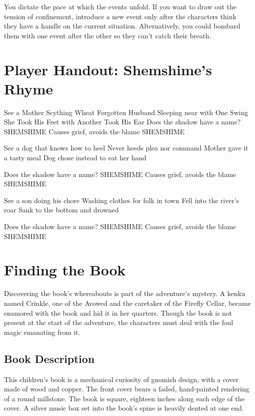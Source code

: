 \documentclass[10pt,a4paper,twoside,bg=print,twocolumn,openany,nodeprecatedcode]{dndbook}
\begin{document}
You dictate the pace at which the events unfold. If you want to draw out the tension of confinement, introduce a new event only after the characters think they have a handle on the current situation. Alternatively, you could bombard them with one event after the other so they can't catch their breath.

\section{Player Handout: Shemshime's Rhyme}
\begin{DndSidebar}[float=!b]{See a Mother Scything Wheat Forgotten Husband Sleeping near with One Swing She Took His Feet with Another Took His Ear}
Does the shadow have a name? SHEMSHIME Causes grief, avoids the blame SHEMSHIME



See a dog that knows how to heel Never heeds plea nor command Mother gave it a tasty meal Dog chose instead to eat her hand



Does the shadow have a name? SHEMSHIME Causes grief, avoids the blame SHEMSHIME



See a son doing his chore Washing clothes for folk in town Fell into the river's roar Sank to the bottom and drowned



Does the shadow have a name? SHEMSHIME Causes grief, avoids the blame SHEMSHIME



\end{DndSidebar}

\section{Finding the Book}
Discovering the book's whereabouts is part of the adventure's mystery. A kenku named Crinkle, one of the Avowed and the caretaker of the Firefly Cellar, became enamored with the book and hid it in her quarters. Though the book is not present at the start of the adventure, the characters must deal with the foul magic emanating from it.

\subsection{Book Description}
This children's book is a mechanical curiosity of gnomish design, with a cover made of wood and copper. The front cover bears a faded, hand-painted rendering of a round millstone. The book is square, eighteen inches along each edge of the cover. A silver music box set into the book's spine is heavily dented at one end.
\end{document}
